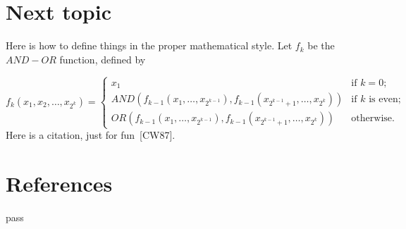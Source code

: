\documentclass[a4paper,12pt]{book}
\renewcommand{\cite}[1]{[#1]}
\begin{document}
\section{Next topic}
\begingroup
\centering


Here is how to define things in the proper mathematical style.
Let $f_k$ be the $AND-OR$ function, defined by

\[ f_k(x_1, x_2, \ldots, x_{2^k}) = \left\{ \begin{array}{ll}

	x_1 & \mbox{if $k = 0$;} \\

	AND(f_{k-1}(x_1, \ldots, x_{2^{k-1}}),
	   f_{k-1}(x_{2^{k-1} + 1}, \ldots, x_{2^k}))
	 & \mbox{if $k$ is even;} \\

	OR(f_{k-1}(x_1, \ldots, x_{2^{k-1}}),
	   f_{k-1}(x_{2^{k-1} + 1}, \ldots, x_{2^k}))	
	& \mbox{otherwise.} 
	\end{array}
	\right. \]
Here is a citation, just for fun~\cite{CW87}.
\section*{References}
pass
\end{document}

